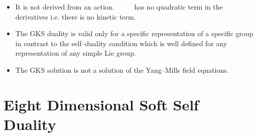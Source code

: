 \documentclass[a4paper,12pt]{book}
\begin{document}
\begin{itemize}
\item  It is not derived from an action. \ \coordHE{}\ \ \ \ has no
quadratic term in the derivatives i.e. there is no kinetic term.

\item  The GKS duality is valid only for a specific representation \coordHE{} of a
specific group \coordHE{} in contrast to the self--duality
condition which is well defined for any representation of any simple Lie
group.

\item  The GKS solution is not a solution of the \coordHE{} Yang--Mills
field equations.
\end{itemize}

\section{Eight Dimensional Soft Self Duality}
\end{document}
